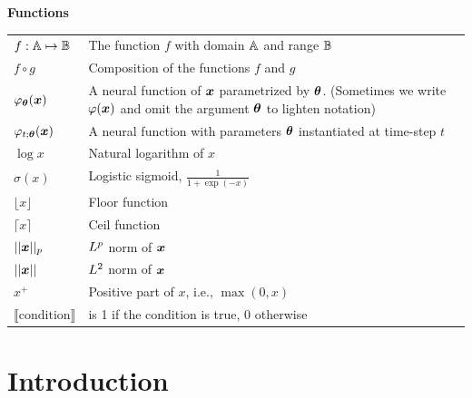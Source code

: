 \documentclass[a4paper,twoside,openright]{book}
\renewcommand\headrulewidth{0pt}
\theoremstyle{plain}
\theoremstyle{definition}
\begin{document}
\centerline{\bf Functions}
\nopagebreak
\begin{tabular}{p{2cm}p{11cm}}
	$\displaystyle f: {\mathbb{A}} \mapsto {\mathbb{B}}$ & The function $f$ with domain ${\mathbb{A}}$ and range ${\mathbb{B}}$\\
	$\displaystyle f \circ g $ & Composition of the functions $f$ and $g$ \\
	$\displaystyle \varphi_{\bm{\theta}}({\bm{x}}) $ & A neural function of ${\bm{x}}$ parametrized by ${\bm{\theta}}$.
	(Sometimes we write $\varphi({\bm{x}})$ and omit the argument ${\bm{\theta}}$ to lighten notation) \\
	$\displaystyle \varphi_{t;{\bm{\theta}}}({\bm{x}}) $ & A neural function with parameters ${\bm{\theta}}$ instantiated at time-step $t$\\
	$\displaystyle \log x$ & Natural logarithm of $x$ \\
	$\displaystyle \sigma(x)$ & Logistic sigmoid, $\displaystyle \frac{1} {1 + \exp(-x)}$ \\
	$\displaystyle \lfloor x \rfloor$ & Floor function\\
	$\displaystyle \lceil x \rceil$ & Ceil function\\
	$\displaystyle || {\bm{x}} ||_p $ & $L^p$ norm of ${\bm{x}}$ \\
	$\displaystyle || {\bm{x}} || $ & $L^2$ norm of ${\bm{x}}$ \\
	$\displaystyle x^+$ & Positive part of $x$, i.e., $\max(0,x)$\\
	$\displaystyle \llbracket\mathrm{condition}\rrbracket$ & is 1 if the condition is true, 0 otherwise\\
\end{tabular}

\tableofcontents


\mainmatter
\fancypagestyle{plain}{
  \fancyfoot{}
  \fancyhead{}
  \renewcommand{\headrulewidth}{0pt}
}

\part*{Introduction}
\label{part:intro}
\end{document}
